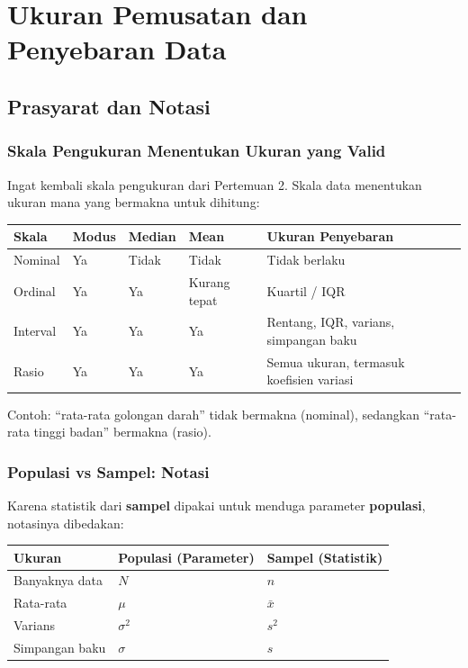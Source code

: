 \documentclass[
  indonesian,
  letterpaper,
]{book}
\newcounter{none} %
\begin{document}

\chapter{Ukuran Pemusatan dan Penyebaran
Data}\label{ukuran-pemusatan-dan-penyebaran-data}

\section{Prasyarat dan Notasi}\label{prasyarat-dan-notasi}

\subsection{Skala Pengukuran Menentukan Ukuran yang
Valid}\label{skala-pengukuran-menentukan-ukuran-yang-valid}

Ingat kembali skala pengukuran dari Pertemuan 2. Skala data menentukan
ukuran mana yang bermakna untuk dihitung:

{\def\LTcaptype{none} %
\begin{longtable}[]{@{}lllll@{}}
\toprule\noalign{}
Skala & Modus & Median & Mean & Ukuran Penyebaran \\
\midrule\noalign{}
\endhead
\bottomrule\noalign{}
\endlastfoot
Nominal & Ya & Tidak & Tidak & Tidak berlaku \\
Ordinal & Ya & Ya & Kurang tepat & Kuartil / IQR \\
Interval & Ya & Ya & Ya & Rentang, IQR, varians, simpangan baku \\
Rasio & Ya & Ya & Ya & Semua ukuran, termasuk koefisien variasi \\
\end{longtable}
}

Contoh: ``rata-rata golongan darah'' tidak bermakna (nominal), sedangkan
``rata-rata tinggi badan'' bermakna (rasio).

\subsection{Populasi vs Sampel: Notasi}\label{populasi-vs-sampel-notasi}

Karena statistik dari \textbf{sampel} dipakai untuk menduga parameter
\textbf{populasi}, notasinya dibedakan:

{\def\LTcaptype{none} %
\begin{longtable}[]{@{}lll@{}}
\toprule\noalign{}
Ukuran & Populasi (Parameter) & Sampel (Statistik) \\
\midrule\noalign{}
\endhead
\bottomrule\noalign{}
\endlastfoot
Banyaknya data & \(N\) & \(n\) \\
Rata-rata & \(\mu\) & \(\bar{x}\) \\
Varians & \(\sigma^2\) & \(s^2\) \\
Simpangan baku & \(\sigma\) & \(s\) \\
\end{longtable}
}
\end{document}
